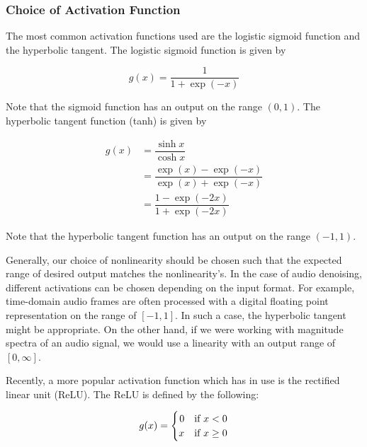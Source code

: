 


\subsubsection{Choice of Activation Function}

The most common activation functions used are the logistic sigmoid function and the hyperbolic tangent. \cite{liu2014experiments} The logistic sigmoid function is given by

\begin{equation}
g(x) = \dfrac{1}{1+\exp{(-x)}}
\end{equation}

Note that the sigmoid function has an output on the range $(0,1)$. The hyperbolic tangent function (tanh) is given by

\begin{align}
g(x) &= \dfrac{\sinh{x}}{\cosh{x}}\\
&= \dfrac{\exp{(x)}-\exp{(-x)}}{\exp{(x)}+\exp{(-x)}}\\
&= \dfrac{1-\exp{(-2x)}}{1+\exp{(-2x)}}
\end{align}

Note that the hyperbolic tangent function has an output on the range $(-1,1)$.

Generally, our choice of nonlinearity should be chosen such that the expected range of desired output matches the nonlinearity's. In the case of audio denoising, different activations can be chosen depending on the input format. For example, time-domain audio frames are often processed with a digital floating point representation on the range of $[-1,1]$. In such a case, the hyperbolic tangent might be appropriate. On the other hand, if we were working with magnitude spectra of an audio signal, we would use a linearity with an output range of $[0,\infty]$.

Recently, a more popular activation function which has in use is the rectified linear unit (ReLU). \cite{glorot2011deep} The ReLU is defined by the following:

\begin{equation}
g(x) =
    \begin{cases}
        \hfill 0 & \text{if $x < 0$}\\
        \hfill x & \text{if $x \ge 0$}
    \end{cases}
\end{equation}

